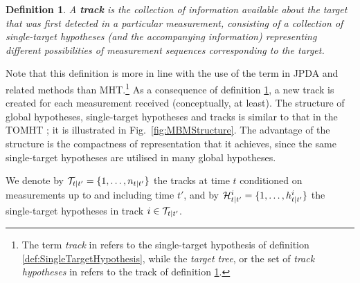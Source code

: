 \documentclass[journal,twoside]{IEEEtran}
\theoremstyle{plain}
\newtheorem{definition}{Definition}
\begin{document}
\begin{definition}\label{def:Track}
A \textbf{track} is the collection of information available about the target that was first detected in a particular measurement, consisting of a collection of single-target hypotheses (and the accompanying information) representing different possibilities of measurement sequences corresponding to the target.
\end{definition}
%
Note that this definition is more in line with the use of the term in JPDA and related methods than MHT.\footnote{The term \emph{track} in \cite{Kur90} refers to the single-target hypothesis of definition \ref{def:SingleTargetHypothesis}, while the \emph{target tree}, or the set of \emph{track hypotheses} in \cite{Kur90} refers to the track of definition \ref{def:Track}.} As a consequence of definition \ref{def:Track}, a new track is created for each measurement received (conceptually, at least). The structure of global hypotheses, single-target hypotheses and tracks is similar to that in the TOMHT \cite{Kur90}; it is illustrated in Fig.~\ref{fig:MBMStructure}. The advantage of the structure is the compactness of representation that it achieves, since the same single-target hypotheses are utilised in many global hypotheses.

We denote by ${\cal T}_{t|t'}=\{1,\dots,n_{t|t'}\}$ the tracks at time $t$ conditioned on measurements up to and including time $t'$, and by ${\cal H}^i_{t|t'}=\{1,\dots,h^i_{t|t'}\}$ the single-target hypotheses in track $i\in{\cal T}_{t|t'}$.
\end{document}

